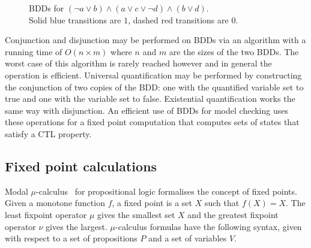 \begin{figure}
\begin{subfigure}[t]{0.5\textwidth}
    \end{subfigure}
    \caption[Example BDD]{BDDs for $(\lnot a \lor b) \land (a \lor c \lor  \lnot d) \land (b \lor d)$. \\Solid blue transitions are $1$, dashed red transitions are $0$.}
    \label{fig:backgroundBDD}
\end{figure}

Conjunction and disjunction may be performed on BDDs via an algorithm with a running time of $O(n \times m)$ where $n$ and $m$ are the sizes of the two BDDs. The worst case of this algorithm is rarely reached however and in general the operation is efficient. Universal quantification may be performed by constructing the conjunction of two copies of the BDD: one with the quantified variable set to true and one with the variable set to false. Existential quantification works the same way with disjunction. An efficient use of BDDs for model checking uses these operations for a fixed point computation that computes sets of states that satisfy a CTL property.

\subsection{Fixed point calculations}

Modal $\mu$-calculus~\cite{Kozen82} for propositional logic formalises the concept of fixed points. Given a monotone function $f$, a fixed point is a set $X$ such that $f(X) = X$. The least fixpoint operator $\mu$ gives the smallest set $X$ and the greatest fixpoint operator $\nu$ gives the largest. $\mu$-calculus formulas have the following syntax, given with respect to a set of propositions $P$ and a set of variables $V$.

